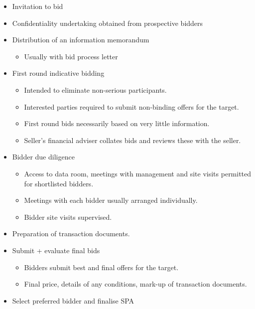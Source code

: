 \documentclass[
]{article}
\providecommand{\tightlist}{%
  \setlength{\itemsep}{0pt}\setlength{\parskip}{0pt}}
\begin{document}
\begin{itemize}
\tightlist
\item
  Invitation to bid
\item
  Confidentiality undertaking obtained from prospective bidders
\item
  Distribution of an information memorandum

  \begin{itemize}
  \tightlist
  \item
    Usually with bid process letter
  \end{itemize}
\item
  First round indicative bidding

  \begin{itemize}
  \tightlist
  \item
    Intended to eliminate non-serious participants.
  \item
    Interested parties required to submit non-binding offers for the
    target.
  \item
    First round bids necessarily based on very little information.
  \item
    Seller's financial adviser collates bids and reviews these with the
    seller.
  \end{itemize}
\item
  Bidder due diligence

  \begin{itemize}
  \tightlist
  \item
    Access to data room, meetings with management and site visits
    permitted for shortlisted bidders.
  \item
    Meetings with each bidder usually arranged individually.
  \item
    Bidder site visits supervised.
  \end{itemize}
\item
  Preparation of transaction documents.
\item
  Submit + evaluate final bids

  \begin{itemize}
  \tightlist
  \item
    Bidders submit best and final offers for the target.
  \item
    Final price, details of any conditions, mark-up of transaction
    documents.
  \end{itemize}
\item
  Select preferred bidder and finalise SPA


\end{itemize}
\end{document}

